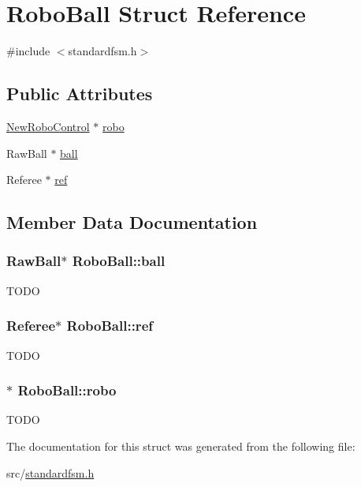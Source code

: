 \hypertarget{structRoboBall}{
\section{RoboBall Struct Reference}
\label{structRoboBall}
}


{\ttfamily \#include $<$standardfsm.h$>$}

\subsection*{Public Attributes}
\begin{DoxyCompactItemize}
\item 
\hyperlink{classNewRoboControl}{NewRoboControl} $\ast$ \hyperlink{structRoboBall_ac8234158d0c28c72770922938f6380d0}{robo}
\item 
RawBall $\ast$ \hyperlink{structRoboBall_a4a2161a4a06fedd50315eab54db744e0}{ball}
\item 
Referee $\ast$ \hyperlink{structRoboBall_a54a77bced0ccff042fe8f701ac7d8009}{ref}
\end{DoxyCompactItemize}


\subsection{Member Data Documentation}
\hypertarget{structRoboBall_a4a2161a4a06fedd50315eab54db744e0}{
\subsubsection[{ball}]{\setlength{\rightskip}{0pt plus 5cm}RawBall$\ast$ {\bf RoboBall::ball}}}
\label{structRoboBall_a4a2161a4a06fedd50315eab54db744e0}
TODO \hypertarget{structRoboBall_a54a77bced0ccff042fe8f701ac7d8009}{
\subsubsection[{ref}]{\setlength{\rightskip}{0pt plus 5cm}Referee$\ast$ {\bf RoboBall::ref}}}
\label{structRoboBall_a54a77bced0ccff042fe8f701ac7d8009}
TODO \hypertarget{structRoboBall_ac8234158d0c28c72770922938f6380d0}{
\subsubsection[{robo}]{$\ast$ {\bf RoboBall::robo}}}
\label{structRoboBall_ac8234158d0c28c72770922938f6380d0}
TODO 

The documentation for this struct was generated from the following file:\begin{DoxyCompactItemize}
\item 
src/\hyperlink{standardfsm_8h}{standardfsm.h}\end{DoxyCompactItemize}
